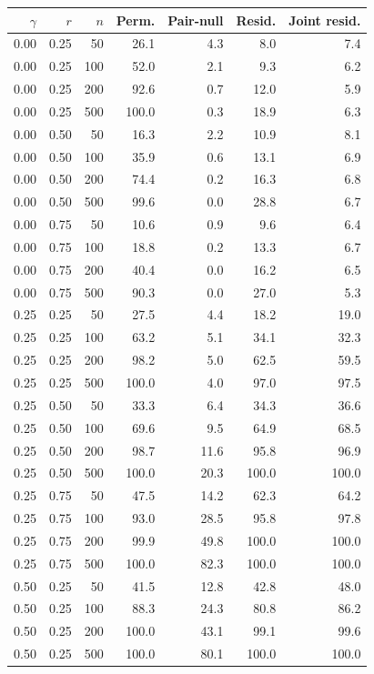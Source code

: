 \begin{tabular}{@{}rrr rrrr@{}}
\toprule
$\gamma$ & $r$ & $n$ & Perm. & Pair-null & Resid. & Joint resid. \\
\midrule
0.00 & 0.25 & 50 & 26.1 & 4.3 & 8.0 & 7.4 \\
0.00 & 0.25 & 100 & 52.0 & 2.1 & 9.3 & 6.2 \\
0.00 & 0.25 & 200 & 92.6 & 0.7 & 12.0 & 5.9 \\
0.00 & 0.25 & 500 & 100.0 & 0.3 & 18.9 & 6.3 \\
0.00 & 0.50 & 50 & 16.3 & 2.2 & 10.9 & 8.1 \\
0.00 & 0.50 & 100 & 35.9 & 0.6 & 13.1 & 6.9 \\
0.00 & 0.50 & 200 & 74.4 & 0.2 & 16.3 & 6.8 \\
0.00 & 0.50 & 500 & 99.6 & 0.0 & 28.8 & 6.7 \\
0.00 & 0.75 & 50 & 10.6 & 0.9 & 9.6 & 6.4 \\
0.00 & 0.75 & 100 & 18.8 & 0.2 & 13.3 & 6.7 \\
0.00 & 0.75 & 200 & 40.4 & 0.0 & 16.2 & 6.5 \\
0.00 & 0.75 & 500 & 90.3 & 0.0 & 27.0 & 5.3 \\
0.25 & 0.25 & 50 & 27.5 & 4.4 & 18.2 & 19.0 \\
0.25 & 0.25 & 100 & 63.2 & 5.1 & 34.1 & 32.3 \\
0.25 & 0.25 & 200 & 98.2 & 5.0 & 62.5 & 59.5 \\
0.25 & 0.25 & 500 & 100.0 & 4.0 & 97.0 & 97.5 \\
0.25 & 0.50 & 50 & 33.3 & 6.4 & 34.3 & 36.6 \\
0.25 & 0.50 & 100 & 69.6 & 9.5 & 64.9 & 68.5 \\
0.25 & 0.50 & 200 & 98.7 & 11.6 & 95.8 & 96.9 \\
0.25 & 0.50 & 500 & 100.0 & 20.3 & 100.0 & 100.0 \\
0.25 & 0.75 & 50 & 47.5 & 14.2 & 62.3 & 64.2 \\
0.25 & 0.75 & 100 & 93.0 & 28.5 & 95.8 & 97.8 \\
0.25 & 0.75 & 200 & 99.9 & 49.8 & 100.0 & 100.0 \\
0.25 & 0.75 & 500 & 100.0 & 82.3 & 100.0 & 100.0 \\
0.50 & 0.25 & 50 & 41.5 & 12.8 & 42.8 & 48.0 \\
0.50 & 0.25 & 100 & 88.3 & 24.3 & 80.8 & 86.2 \\
0.50 & 0.25 & 200 & 100.0 & 43.1 & 99.1 & 99.6 \\
0.50 & 0.25 & 500 & 100.0 & 80.1 & 100.0 & 100.0 \\

\end{tabular}
